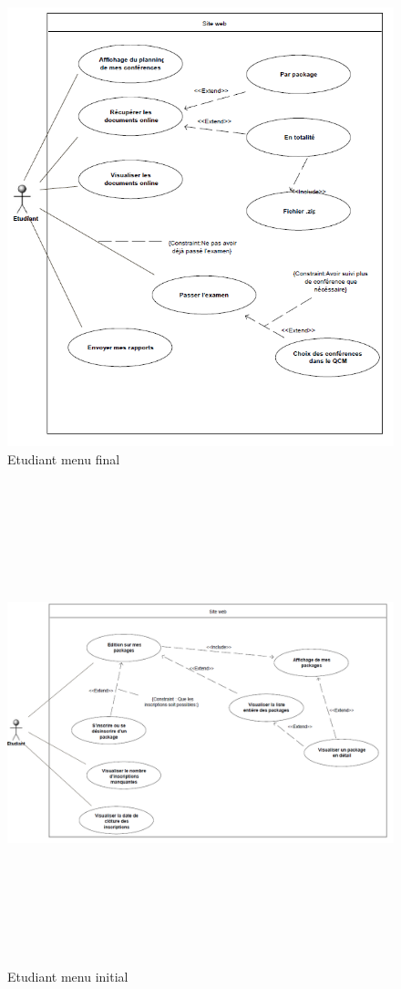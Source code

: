     \begin{figure}[h]
        \begin{center}
            \includegraphics[scale= 0.70]{images/uml/etudiantMenuFinal.png} 
        \end{center}

        \caption{Etudiant menu final}
        \label{Etudiant menu final}
    \end{figure}

    \begin{figure}[h]
        \begin{center}
            \includegraphics[height=14cm,width=15cm]{images/uml/etudiantMenuInitial.png} 
        \end{center}

        \caption{Etudiant menu initial}
        \label{Etudiant menu initial}
    \end{figure}

